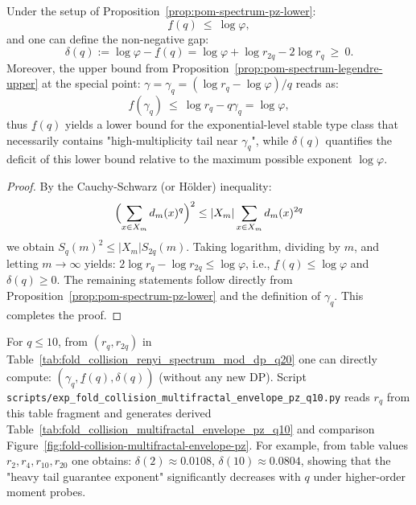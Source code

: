 \begin{corollary}\label{cor:pom-spectrum-intermittency-deficit}
Under the setup of Proposition~\ref{prop:pom-spectrum-pz-lower}:
\[
\underline f(q)\ \le\ \log\varphi,
\]
and one can define the non-negative gap:
\[
\boxed{\;
\delta(q):=\log\varphi-\underline f(q)
=\log\varphi+\log r_{2q}-2\log r_q\ \ge\ 0.\;}
\]
Moreover, the upper bound from Proposition~\ref{prop:pom-spectrum-legendre-upper} at the special point:
\(
\gamma=\gamma_q=(\log r_q-\log\varphi)/q
\)
reads as:
\[
f(\gamma_q)\ \le\ \log r_q-q\gamma_q=\log\varphi,
\]
thus $\underline f(q)$ yields a lower bound for the exponential-level stable type class that necessarily contains "high-multiplicity tail near $\gamma_q$", while $\delta(q)$ quantifies the deficit of this lower bound relative to the maximum possible exponent $\log\varphi$.
\end{corollary}
\begin{proof}
By the Cauchy-Schwarz (or Hölder) inequality:
\[
\Bigl(\sum_{x\in X_m}d_m(x)^q\Bigr)^2\le |X_m|\sum_{x\in X_m}d_m(x)^{2q}
\]
we obtain $S_q(m)^2\le |X_m|S_{2q}(m)$. Taking logarithm, dividing by $m$, and letting $m\to\infty$ yields:
\(
2\log r_q-\log r_{2q}\le \log\varphi
\),
i.e., $\underline f(q)\le\log\varphi$ and $\delta(q)\ge 0$.
The remaining statements follow directly from Proposition~\ref{prop:pom-spectrum-pz-lower} and the definition of $\gamma_q$. This completes the proof.
\end{proof}

\begin{remark}[Reproducible readout: lower envelope points for \texorpdfstring{$q\le 10$}{q<=10} and bilateral envelope diagram]\label{rem:pom-spectrum-pz-numerics}
For $q\le 10$, from $(r_q,r_{2q})$ in Table~\ref{tab:fold_collision_renyi_spectrum_mod_dp_q20} one can directly compute:
\(
(\gamma_q,\underline f(q),\delta(q))
\)
(without any new DP).
Script \texttt{scripts/exp\_fold\_collision\_multifractal\_envelope\_pz\_q10.py} reads $r_q$ from this table fragment and generates derived Table~\ref{tab:fold_collision_multifractal_envelope_pz_q10} and comparison Figure~\ref{fig:fold-collision-multifractal-envelope-pz}.
For example, from table values $r_2,r_4,r_{10},r_{20}$ one obtains:
\(
\delta(2)\approx 0.0108
\),
\(
\delta(10)\approx 0.0804
\),
showing that the "heavy tail guarantee exponent" significantly decreases with $q$ under higher-order moment probes.


\end{remark}


